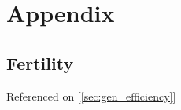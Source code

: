 
\chapter{Appendix} %
\label{Appendix}


% 
%
%
%



% 
%
%
%
\section{Fertility}
\label{annex:fertility-table}
Referenced on [\ref{sec:gen_efficiency}]\\

